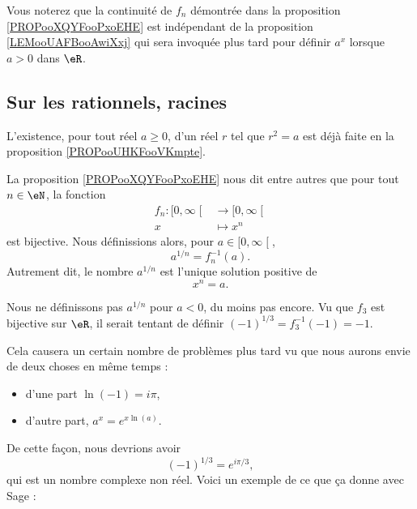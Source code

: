Vous noterez que la continuité de \( f_n\) démontrée dans la proposition \ref{PROPooXQYFooPxoEHE} est indépendant de la proposition \ref{LEMooUAFBooAwiXxj} qui sera invoquée plus tard pour définir \( a^x\) lorsque \( a>0\) dans \( \eR\).

\subsection{Sur les rationnels, racines}

L'existence, pour tout réel \( a\geq 0\), d'un réel \( r\) tel que \( r^2=a\) est déjà faite en la proposition \ref{PROPooUHKFooVKmpte}.

\begin{definition}        \label{DEFooJWQLooWkOBxQ}
	La proposition \ref{PROPooXQYFooPxoEHE} nous dit entre autres que pour tout \( n\in \eN\), la fonction
	\begin{equation}
		\begin{aligned}
			f_n\colon \mathopen[ 0 , \infty \mathclose[ & \to \mathopen[ 0 , \infty \mathclose[ \\
			x                                           & \mapsto x^n
		\end{aligned}
	\end{equation}
	est bijective. Nous définissions alors, pour \( a\in \mathopen[ 0 , \infty \mathclose[\),
	\begin{equation}
		a^{1/n}=f_n^{-1}(a).
	\end{equation}
	Autrement dit, le nombre \( a^{1/n}\) est l'unique solution positive de
	\begin{equation}
		x^n=a.
	\end{equation}
\end{definition}

\begin{normaltext}      \label{NORMooDUNZooUNdUKg}
	Nous ne définissons pas \( a^{1/n}\) pour \( a<0\), du moins pas encore. Vu que \( f_3\) est bijective sur \( \eR\), il serait tentant de définir \( (-1)^{1/3}=f_3^{-1}(-1)=-1\).

	Cela causera un certain nombre de problèmes plus tard vu que nous aurons envie de deux choses en même temps :
	\begin{itemize}
		\item d'une part \( \ln(-1)=i\pi\),
		\item d'autre part, \( a^x= e^{x\ln(a)}\).
	\end{itemize}
	De cette façon, nous devrions avoir
	\begin{equation}
		(-1)^{1/3}= e^{i\pi /3},
	\end{equation}
	qui est un nombre complexe non réel. Voici un exemple de ce que ça donne avec Sage :
	
\end{normaltext}

